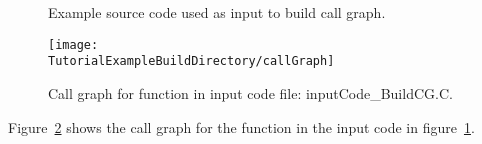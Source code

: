 \begin{figure}[!h]
{\indent
{\mySmallFontSize

\label{Tutorial:exampleInputCode_BuildCG}

\begin{latexonly}
   
\end{latexonly}

\begin{htmlonly}
   
\end{htmlonly}

}
}
\caption{Example source code used as input to build call graph.}
\end{figure}


\begin{figure}
\texttt{[image: \\TutorialExampleBuildDirectory/callGraph]}
\caption{Call graph for function in input code file: inputCode\_BuildCG.C.}
\label{Tutorial:exampleBuildCGGraph}
\end{figure}

   Figure~\ref{Tutorial:exampleBuildCGGraph} shows the call graph for the
function in the input code in figure~\ref{Tutorial:exampleInputCode_BuildCG}.



